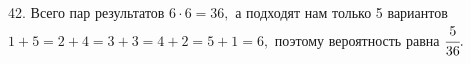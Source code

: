 42. Всего пар результатов $6\cdot6=36,$ а подходят нам только 5 вариантов $1+5=2+4=3+3=4+2=5+1=6,$ поэтому вероятность равна $\cfrac{5}{36}.$\\
